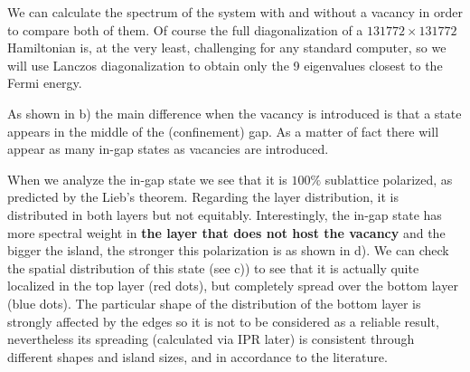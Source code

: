 We can calculate the spectrum of the system with and without a vacancy in order to compare both of them. Of course the full diagonalization of a $131772\times131772$ Hamiltonian is, at the very least, challenging for any standard computer, so we will use Lanczos diagonalization\cite{Lanczos1950, Ojalvo1970, Arnoldi1951} to obtain only the 9 eigenvalues closest to the Fermi energy.

As shown in b) the main difference when the vacancy is introduced is that a state appears in the middle of the (confinement) gap. As a matter of fact there will appear as many in-gap states as vacancies are introduced.

When we analyze the in-gap state we see that it is $100\%$ sublattice polarized, as predicted by the Lieb's theorem\cite{Lieb1989}. Regarding the layer distribution, it is distributed in both layers but not equitably. Interestingly, the in-gap state has more spectral weight in \textbf{the layer that does not host the vacancy} and the bigger the island, the stronger this polarization is as shown in d).
We can check the spatial distribution of this state (see c)) to see that it is actually quite localized in the top layer (red dots), but completely spread over the bottom layer (blue dots). The particular shape of the distribution of the bottom layer is strongly affected by the edges so it is not to be considered as a reliable result, nevertheless its spreading (calculated via IPR later) is consistent through different shapes and island sizes, and in accordance to the literature\cite{Castro2010}.



